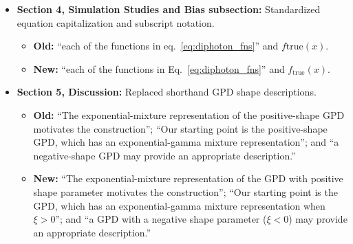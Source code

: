 \documentclass[11pt,a4paper]{article}
\begin{document}
\begin{itemize}
    \item \textbf{Section 4, Simulation Studies and Bias subsection:} Standardized equation capitalization and subscript notation.
    \begin{itemize}
        \item \textbf{Old:} ``each of the functions in eq.~\eqref{eq:diphoton_fns}'' and $f{\mathrm{true}}(x)$.
        \item \textbf{New:} ``each of the functions in Eq.~\eqref{eq:diphoton_fns}'' and $f_{\mathrm{true}}(x)$.
    \end{itemize}

    \item \textbf{Section 5, Discussion:} Replaced shorthand GPD shape descriptions.
    \begin{itemize}
        \item \textbf{Old:} ``The exponential-mixture representation of the positive-shape GPD motivates the construction''; ``Our starting point is the positive-shape GPD, which has an exponential-gamma mixture representation''; and ``a negative-shape GPD may provide an appropriate description.''
        \item \textbf{New:} ``The exponential-mixture representation of the GPD with positive shape parameter motivates the construction''; ``Our starting point is the GPD, which has an exponential-gamma mixture representation when $\xi>0$''; and ``a GPD with a negative shape parameter ($\xi<0$) may provide an appropriate description.''
    \end{itemize}


\end{itemize}
\end{document}
